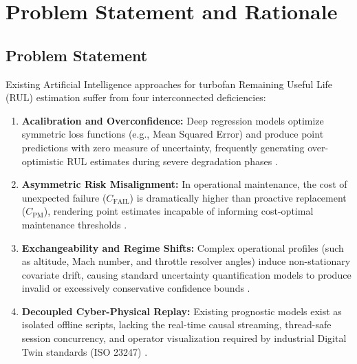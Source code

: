 \documentclass[12pt,a4paper]{article}
\begin{document}
\section{Problem Statement and Rationale}

\subsection{Problem Statement}
Existing Artificial Intelligence approaches for turbofan Remaining Useful Life (RUL) estimation suffer from four interconnected deficiencies:
\begin{enumerate}[label=(\roman*),leftmargin=1.8em]
    \item \textbf{Acalibration and Overconfidence:} Deep regression models optimize symmetric loss functions (e.g., Mean Squared Error) and produce point predictions with zero measure of uncertainty, frequently generating over-optimistic RUL estimates during severe degradation phases \cite{javanmardi2023conformal}.
    \item \textbf{Asymmetric Risk Misalignment:} In operational maintenance, the cost of unexpected failure ($C_{\text{FAIL}}$) is dramatically higher than proactive replacement ($C_{\text{PM}}$), rendering point estimates incapable of informing cost-optimal maintenance thresholds \cite{cortesgomez2025predictive}.
    \item \textbf{Exchangeability and Regime Shifts:} Complex operational profiles (such as altitude, Mach number, and throttle resolver angles) induce non-stationary covariate drift, causing standard uncertainty quantification models to produce invalid or excessively conservative confidence bounds \cite{zhu2025regime}.
    \item \textbf{Decoupled Cyber-Physical Replay:} Existing prognostic models exist as isolated offline scripts, lacking the real-time causal streaming, thread-safe session concurrency, and operator visualization required by industrial Digital Twin standards (ISO 23247) \cite{chen2022digital, walia2026digital}.
\end{enumerate}
\end{document}
